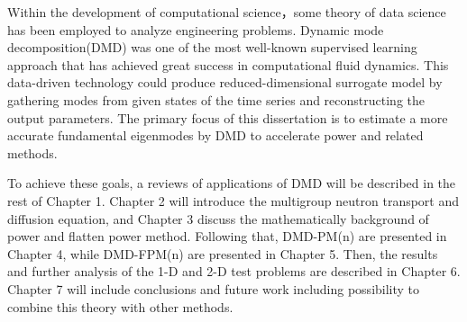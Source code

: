 Within the development of computational science，some theory of data science has been employed to analyze engineering problems.
Dynamic mode decomposition(DMD) was one of the most well-known supervised learning approach that has achieved great success in computational fluid dynamics.
This data-driven technology could produce reduced-dimensional surrogate model by gathering modes from given states of the time series and reconstructing the output parameters.
The primary focus of this dissertation is to estimate a more accurate fundamental eigenmodes by DMD to accelerate power and related methods.

To achieve these goals, a reviews of applications of DMD will be described in the rest of Chapter 1.
Chapter 2 will introduce the multigroup neutron transport and diffusion equation, and Chapter 3 discuss the mathematically background of power and flatten power method.
Following that, DMD-PM(n) are presented in Chapter 4, while DMD-FPM(n) are presented in Chapter 5.
Then, the results and further analysis of the 1-D and 2-D test problems are described in Chapter 6.
Chapter 7 will include conclusions and future work including possibility to combine this theory with other methods. 


